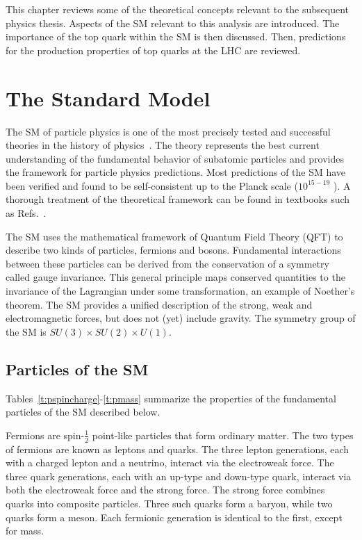 

This chapter reviews some of the theoretical concepts relevant to the subsequent physics thesis. Aspects of the SM relevant to this analysis are introduced. The importance of the top quark within the SM is then discussed. Then, predictions for the production properties of top quarks at the LHC are reviewed.

\section{The Standard Model}

The SM of particle physics is one of the most precisely tested and successful theories in the history of physics~\cite{peskin}. The theory represents the best current understanding of the fundamental behavior of subatomic particles and provides the framework for particle physics predictions. Most predictions of the SM have been verified and found to be self-consistent up to the Planck scale ($10^{15-19}$ \gev). A thorough treatment of the theoretical framework can be found in textbooks such as Refs.~\cite{peskin,halzen1984quarks,PDG}.

The SM uses the mathematical framework of Quantum Field Theory (QFT) to describe two kinds of particles, fermions and bosons. Fundamental interactions between these particles can be derived from the conservation of a symmetry called gauge invariance. This general principle maps conserved quantities to the invariance of the Lagrangian under some transformation, an example of Noether's theorem. The SM provides a unified description of the strong, weak and electromagnetic forces, but does not (yet) include gravity. The symmetry group of the SM is $SU(3)\times SU(2)\times U(1)$.
\subsection{Particles of the SM}

Tables~\ref{t:pspincharge}-\ref{t:pmass} summarize the properties of the fundamental particles of the SM described below.

Fermions are spin-$\frac{1}{2}$ point-like particles that form ordinary matter. The two types of fermions are known as leptons and quarks. The three lepton generations, each with a charged lepton and a neutrino, interact via the electroweak force. The three quark generations, each with an up-type and down-type quark, interact via both the electroweak force and the strong force. The strong force combines quarks into composite particles. Three such quarks form a baryon, while two quarks form a meson. Each fermionic generation is identical to the first, except for mass. 

